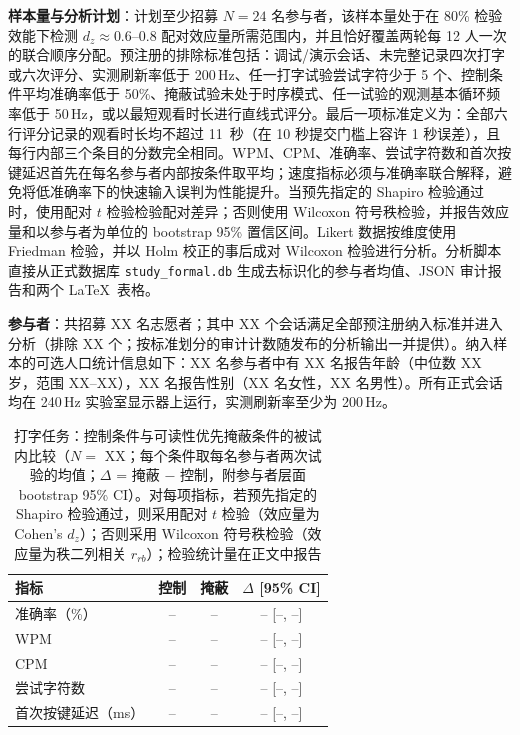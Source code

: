 \documentclass{ieeeaccess}
\begin{document}
{\textbf{样本量与分析计划}：计划至少招募 $N=24$ 名参与者，该样本量处于在 80\% 检验效能下检测 $d_z\approx0.6$--$0.8$ 配对效应量所需范围内，并且恰好覆盖两轮每 12 人一次的联合顺序分配。预注册的排除标准包括：调试/演示会话、未完整记录四次打字或六次评分、实测刷新率低于 200\,Hz、任一打字试验尝试字符少于 5 个、控制条件平均准确率低于 50\%、掩蔽试验未处于时序模式、任一试验的观测基本循环频率低于 50\,Hz，或以最短观看时长进行直线式评分。最后一项标准定义为：全部六行评分记录的观看时长均不超过 11~秒（在 10 秒提交门槛上容许 1 秒误差），且每行内部三个条目的分数完全相同。WPM、CPM、准确率、尝试字符数和首次按键延迟首先在每名参与者内部按条件取平均；速度指标必须与准确率联合解释，避免将低准确率下的快速输入误判为性能提升。当预先指定的 Shapiro 检验通过时，使用配对 $t$ 检验检验配对差异；否则使用 Wilcoxon 符号秩检验，并报告效应量和以参与者为单位的 bootstrap 95\% 置信区间。Likert 数据按维度使用 Friedman 检验，并以 Holm 校正的事后成对 Wilcoxon 检验进行分析。分析脚本直接从正式数据库 \texttt{study\_formal.db} 生成去标识化的参与者均值、JSON 审计报告和两个 \LaTeX\ 表格。

\textbf{参与者}：共招募 XX 名志愿者；其中 XX 个会话满足全部预注册纳入标准并进入分析（排除 XX 个；按标准划分的审计计数随发布的分析输出一并提供）。纳入样本的可选人口统计信息如下：XX 名参与者中有 XX 名报告年龄（中位数 XX 岁，范围 XX--XX），XX 名报告性别（XX 名女性，XX 名男性）。所有正式会话均在 240\,Hz 实验室显示器上运行，实测刷新率至少为 200\,Hz。

\begin{table}[!t]
\caption{打字任务：控制条件与可读性优先掩蔽条件的被试内比较（$N=$ XX；每个条件取每名参与者两次试验的均值；$\Delta$ = 掩蔽 $-$ 控制，附参与者层面 bootstrap 95\% CI）。对每项指标，若预先指定的 Shapiro 检验通过，则采用配对 $t$ 检验（效应量为 Cohen's $d_z$）；否则采用 Wilcoxon 符号秩检验（效应量为秩二列相关 $r_{rb}$）；检验统计量在正文中报告}
\label{tab:study_typing}
\centering
\footnotesize
\setlength{\tabcolsep}{4pt}
\begin{tabular}{lccc}
\toprule
指标 & 控制 & 掩蔽 & $\Delta$ [95\% CI] \\
\midrule
准确率（\%） & -- & -- & -- [--, --] \\
WPM & -- & -- & -- [--, --] \\
CPM & -- & -- & -- [--, --] \\
尝试字符数 & -- & -- & -- [--, --] \\
首次按键延迟（ms） & -- & -- & -- [--, --] \\
\bottomrule
\end{tabular}
\end{table}

}
\end{document}
